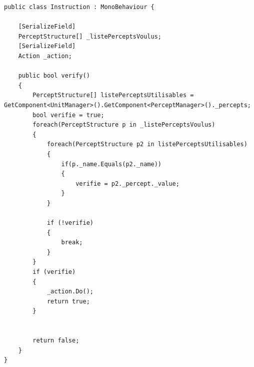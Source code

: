 \documentclass{report}
\begin{document}
\begin{lstlisting}[language={[Sharp]C},label={lst:unitScript}, caption=  Classe Instruction du fichier Instruction.cs première version.]
public class Instruction : MonoBehaviour {

    [SerializeField]
    PerceptStructure[] _listePerceptsVoulus;
    [SerializeField]
    Action _action;

    public bool verify()
    {
        PerceptStructure[] listePerceptsUtilisables = GetComponent<UnitManager>().GetComponent<PerceptManager>()._percepts;
        bool verifie = true;
        foreach(PerceptStructure p in _listePerceptsVoulus)
        {
            foreach(PerceptStructure p2 in listePerceptsUtilisables)
            {
                if(p._name.Equals(p2._name))
                {
                    verifie = p2._percept._value;
                }
            }

            if (!verifie)
            {
                break;
            }
        }
        if (verifie)
        {
            _action.Do();
            return true;
        }


        return false;
    }
}
\end{lstlisting}
\end{document}
